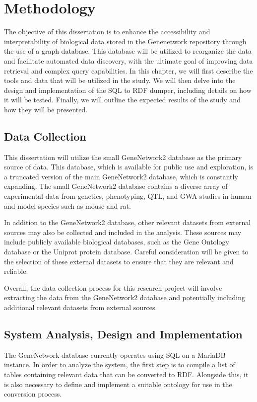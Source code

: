 \section{Methodology}

The objective of this dissertation is to enhance the accessibility and interpretability of biological data stored in the Genenetwork repository through the use of a graph database. This database will be utilized to reorganize the data and facilitate automated data discovery, with the ultimate goal of improving data retrieval and complex query capabilities. In this chapter, we will first describe the tools and data that will be utilized in the study. We will then delve into the design and implementation of the SQL to RDF dumper, including details on how it will be tested. Finally, we will outline the expected results of the study and how they will be presented.

\subsection{Data Collection}

This dissertation will utilize the small GeneNetwork2 database as the primary source of data. This database, which is available for public use and exploration, is a truncated version of the main GeneNetwork2 database, which is constantly expanding. The small GeneNetwork2 database contains a diverse array of experimental data from genetics, phenotyping, QTL, and GWA studies in human and model species such as mouse and rat.

In addition to the GeneNetwork2 database, other relevant datasets from external sources may also be collected and included in the analysis. These sources may include publicly available biological databases, such as the Gene Ontology database or the Uniprot protein database. Careful consideration will be given to the selection of these external datasets to ensure that they are relevant and reliable.

Overall, the data collection process for this research project will involve extracting the data from the GeneNetwork2 database and potentially including additional relevant datasets from external sources.


\subsection{System Analysis, Design and Implementation}

The GeneNetwork database currently operates using SQL on a MariaDB instance. In order to analyze the system, the first step is to compile a list of tables containing relevant data that can be converted to RDF. Alongside this, it is also necessary to define and implement a suitable ontology for use in the conversion process.

